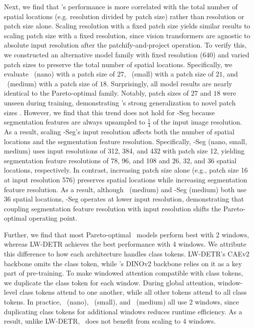 Next, we find that \method's performance is more correlated with the total number of spatial locations (e.g. resolution divided by patch size) rather than resolution or patch size alone. Scaling resolution with a fixed patch size yields similar results to scaling patch size with a fixed resolution, since vision transformers are agnostic to absolute input resolution after the patchify-and-project operation. To verify this, we constructed an alternative model family with fixed resolution ($640$) and varied patch sizes to preserve the total number of spatial locations. Specifically, we evaluate \method \ (nano) with a patch size of $27$, \method \ (small) with a patch size of $21$, and \method \ (medium) with a patch size of $18$. Surprisingly, all model results are nearly identical to the Pareto-optimal family. Notably, patch sizes of $27$ and $18$ were unseen during training, demonstrating \method's strong generalization to novel patch sizes \citep{beyer2023flexivit}. However, we find that this trend does not hold for \method-Seg because segmentation features are always upsampled to $\frac{1}{4}$ of the input image resolution. As a result, scaling \method-Seg's input resolution affects both the number of spatial locations and the segmentation feature resolution. Specifically, \method-Seg (nano, small, medium) uses input resolutions of 312, 384, and 432 with patch size 12, yielding segmentation feature resolutions of 78, 96, and 108 and 26, 32, and 36 spatial locations, respectively. In contrast, increasing patch size alone (e.g., patch size 16 at input resolution 576) preserves spatial locations while increasing segmentation feature resolution. As a result, although \method\ (medium) and \method-Seg (medium) both use 36 spatial locations, \method-Seg operates at lower input resolution, demonstrating that coupling segmentation feature resolution with input resolution shifts the Pareto-optimal operating point.

Further, we find that most Pareto-optimal \method \ models perform best with 2 windows, whereas LW-DETR achieves the best performance with 4 windows. We attribute this difference to how each architecture handles class tokens. LW-DETR’s CAEv2 backbone omits the class token, while \method's DINOv2 backbone relies on it as a key part of pre-training. To make windowed attention compatible with class tokens, we duplicate the class token for each window. During global attention, window-level class tokens attend to one another, while all other tokens attend to all class tokens. In practice, \method \ (nano), \method \ (small), and \method \ (medium) all use 2 windows, since duplicating class tokens for additional windows reduces runtime efficiency. As a result, unlike LW-DETR, \method \ does not benefit from scaling to 4 windows.

